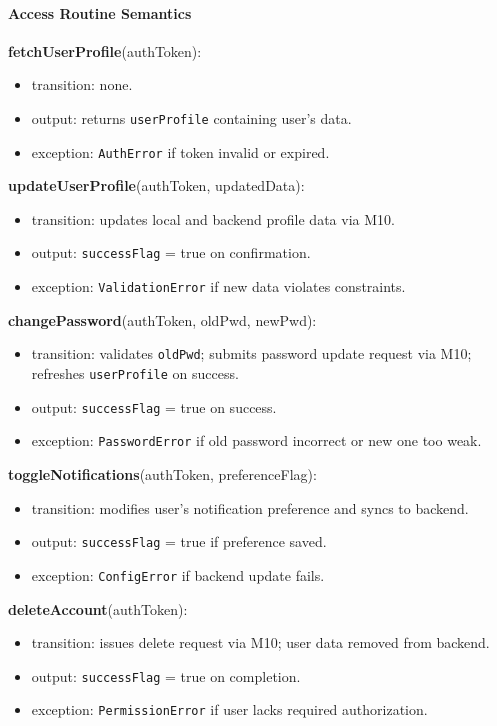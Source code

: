\documentclass[12pt, titlepage]{article}
\begin{document}
\paragraph{Access Routine Semantics}

\noindent \textbf{fetchUserProfile}(authToken):
\begin{itemize}
  \item transition: none.
  \item output: returns \texttt{userProfile} containing user’s data.
  \item exception: \texttt{AuthError} if token invalid or expired.
\end{itemize}

\noindent \textbf{updateUserProfile}(authToken, updatedData):
\begin{itemize}
  \item transition: updates local and backend profile data via M10.
  \item output: \texttt{successFlag} = true on confirmation.
  \item exception: \texttt{ValidationError} if new data violates constraints.
\end{itemize}

\noindent \textbf{changePassword}(authToken, oldPwd, newPwd):
\begin{itemize}
  \item transition: validates \texttt{oldPwd}; submits password update request via M10; refreshes \texttt{userProfile} on success.
  \item output: \texttt{successFlag} = true on success.
  \item exception: \texttt{PasswordError} if old password incorrect or new one too weak.
\end{itemize}

\noindent \textbf{toggleNotifications}(authToken, preferenceFlag):
\begin{itemize}
  \item transition: modifies user’s notification preference and syncs to backend.
  \item output: \texttt{successFlag} = true if preference saved.
  \item exception: \texttt{ConfigError} if backend update fails.
\end{itemize}

\noindent \textbf{deleteAccount}(authToken):
\begin{itemize}
  \item transition: issues delete request via M10; user data removed from backend.
  \item output: \texttt{successFlag} = true on completion.
  \item exception: \texttt{PermissionError} if user lacks required authorization.
\end{itemize}
\end{document}
